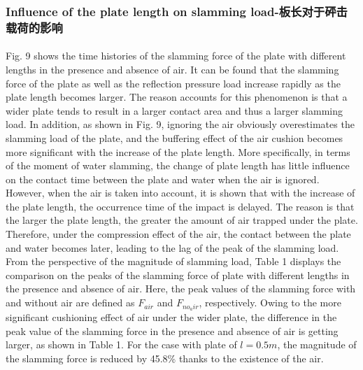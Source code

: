 \documentclass[UTF8]{ctexart}
\begin{document}
\subsubsection{Influence of the plate length on slamming load-板长对于砰击载荷的影响}
\paragraph{\quad}Fig. 9 shows the time histories of the slamming force of the plate 
                with different lengths in the presence and absence of air. It can be 
                found that the slamming force of the plate as well as the reflection 
                pressure load increase rapidly as the plate length becomes larger. 
                The reason accounts for this phenomenon is that a wider plate tends 
                to result in a larger contact area and thus a larger slamming load. 
                In addition, as shown in Fig. 9, ignoring the air obviously overestimates 
                the slamming load of the plate, and the buffering effect of the air cushion 
                becomes more significant with the increase of the plate length. More specifically, 
                in terms of the moment of water slamming, the change of plate length has little 
                influence on the contact time between the plate and water when the air is ignored. 
                However, when the air is taken into account, it is shown that with the increase of 
                the plate length, the occurrence time of the impact is delayed. The reason is that 
                the larger the plate length, the greater the amount of air trapped under the plate. 
                Therefore, under the compression effect of the air, the contact between the plate and 
                water becomes later, leading to the lag of the peak of the slamming load. From the 
                perspective of the magnitude of slamming load, Table 1 displays the comparison on 
                the peaks of the slamming force of plate with different lengths in the presence and 
                absence of air. Here, the peak values of the slamming force with and without air are 
                defined as $F_{air}$ and $F_{no_air}$, respectively. Owing to the more significant cushioning 
                effect of air under the wider plate, the difference in the peak value of the slamming 
                force in the presence and absence of air is getting larger, as shown in Table 1. 
                For the case with plate of $l = 0.5m$, the magnitude of the slamming force is reduced by 
                45.8\% thanks to the existence of the air.
\end{document}
